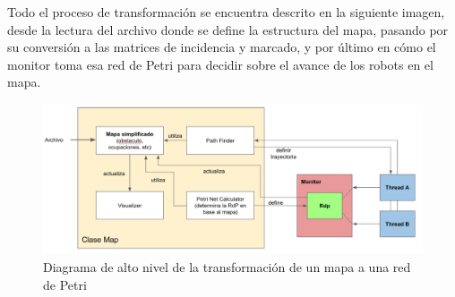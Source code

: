 Todo el proceso de transformación se encuentra descrito en la siguiente imagen, desde la lectura del archivo donde se define la estructura del mapa, pasando por su conversión a las matrices de incidencia y marcado, y por último en cómo el monitor toma esa red de Petri para decidir sobre el avance de los robots en el mapa.

\begin{figure}[H]
   \centering
   \includegraphics[width=1.0\linewidth]{images/mapa_to_rdp.png}
   \caption{Diagrama de alto nivel de la transformación de un mapa a una red de Petri}
   \label{fig:mapa_to_rdp}
\end{figure}